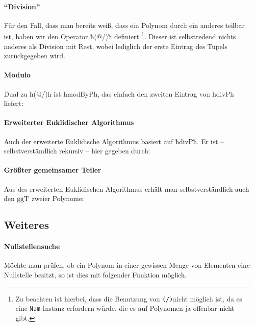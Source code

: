 \paragraph{"`Division"'} Für den Fall, dass man bereits weiß, dass ein
Polynom durch ein anderes teilbar ist, haben wir den Operator ħ(@/)ħ definiert
\footnote{Zu beachten ist hierbei, dass die Benutzung 
von \lstinline{(/)}nicht möglich 
ist, da es eine \lstinline{Num}-Instanz erfordern würde, die es auf Polynomen ja
offenbar nicht gibt.}.
Dieser ist selbstredend nichts anderes als Division mit Rest, wobei lediglich
der erste Eintrag des Tupels zurückgegeben wird.



\paragraph{Modulo} Dual zu ħ(@/)ħ ist ħmodByPħ, das einfach den zweiten Eintrag
von ħdivPħ liefert:



\paragraph{Erweiterter Euklidischer Algorithmus} Auch der erweiterte
Euklidische Algorithmus basiert auf ħdivPħ. Er ist -- selbstverständlich
rekursiv -- hier gegeben durch:


\paragraph{Größter gemeinsamer Teiler} Aus des erweiterten Euklidischen
Algorithmus erhält man selbstverständlich auch den $\operatorname{ggT}$ zweier Polynome:


\subsection{Weiteres}

\paragraph{Nullstellensuche} Möchte man prüfen, ob ein Polynom in einer
gewissen Menge von Elementen eine Nullstelle besitzt, so ist dies mit folgender
Funktion möglich.

